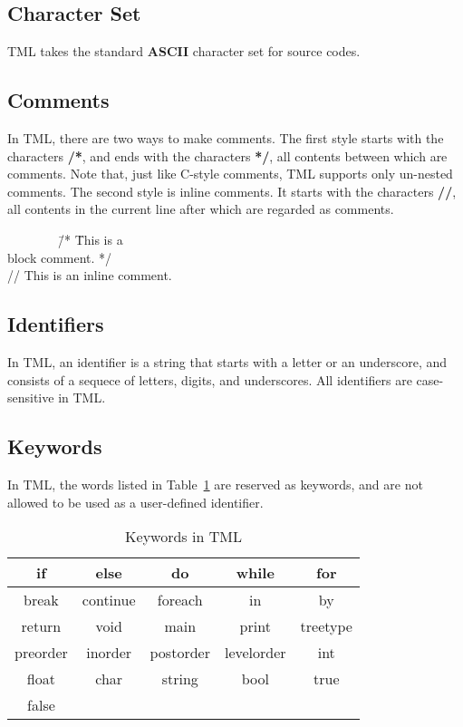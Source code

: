 \documentclass[12pt,psfig,a4]{article}
\begin{document}

\subsection{Character Set}
TML takes the standard \textbf{ASCII} character set for source codes.

\subsection{Comments}
In TML, there are two ways to make comments. The first style starts with the characters \textbf{/*}, and ends with the characters \textbf{*/}, all contents between which are comments. Note that, just like C-style comments, TML supports only un-nested comments. The second style is inline comments. It starts with the characters \textbf{//}, all contents in the current line after which are regarded as comments.

\begin{code}
\begin{tabbing}
~~~~~~~~\= /*  \=This is a \\
\> \> block comment. */\\
\> // This is an inline comment.
\end{tabbing}
\end{code}

\subsection{Identifiers} \label{lexConId}
In TML, an identifier is a string that starts with a letter or an underscore, and consists of a sequece of letters, digits, and underscores. %
All identifiers are case-sensitive in TML.

\subsection{Keywords}
In TML, the words listed in Table~\ref{keywords} are reserved as keywords, and are not allowed to be used as a user-defined identifier.

\begin{table}[!ht]
\begin{center}
\begin{tabular}{| c | c | c | c | c |}
\hline
if & else & do & while & for \\
\hline
break & continue & foreach & in & by     \\  %
\hline
return & void & main & print & treetype \\
\hline
preorder & inorder & postorder & levelorder & int\\
\hline
float & char & string & bool  & true\\
\hline
false & & & &\\
\hline
\end{tabular}
\caption{Keywords in TML}
\label{keywords}
\end {center}
\end{table}
\end{document}

